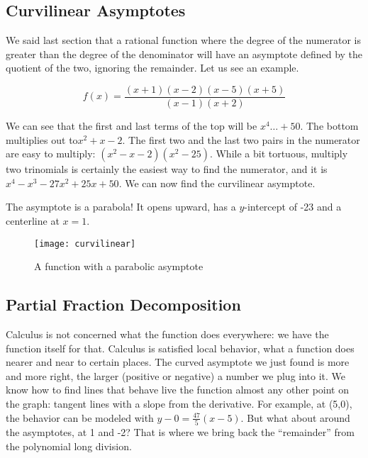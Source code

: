 

\subsection{Curvilinear Asymptotes}
We said last section that a rational function where the degree of the numerator is greater than
the degree of the denominator will have an asymptote defined by the quotient of the two,
ignoring the remainder.  Let us see an example.

$$
f(x)=\frac{(x+1)(x-2)(x-5)(x+5)}{(x-1)(x+2)}
$$

We can see that the first and last terms of the top will be $x^4 \dots +50$.  The bottom 
multiplies out to$x^2+x-2$.  The first two and the last two pairs in the numerator are easy 
to multiply: $(x^2-x-2)(x^2-25)$.  While a bit tortuous, multiply two trinomials is certainly
the easiest way to find the numerator, and it is $x^4-x^3-27x^2+25x+50$.  We can now find
the curvilinear asymptote.


The asymptote is a parabola!  It opens upward, has a $y$-intercept of -23 and a centerline 
at $x=1$.

\begin{figure}
\begin{centering}
\texttt{[image: curvilinear]}
\caption{A function with a parabolic asymptote}
\end{centering}
\end{figure}

\subsection{Partial Fraction Decomposition}
Calculus is not concerned what the function does everywhere: we have the function itself
for that.  Calculus is satisfied local behavior, what a function does nearer and near to
certain places.  The curved asymptote we just found is more and more right, the larger 
(positive or negative) a number we plug into it.  We know how to find lines that behave
live the function almost any other point on the graph: tangent lines with a slope from
the derivative.  For example, at (5,0), the behavior can be modeled with 
$y-0 = \frac{47}{5}(x-5)$.  But what about around the asymptotes, at 1 and -2?  That is
where we bring back the ``remainder'' from the polynomial long division.


